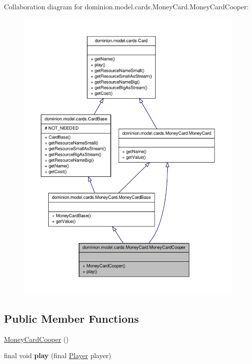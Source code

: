 \-Collaboration diagram for dominion.\-model.\-cards.\-Money\-Card.\-Money\-Card\-Cooper\-:
\nopagebreak
\begin{figure}[H]
\begin{center}
\leavevmode
\includegraphics[width=350pt]{classdominion_1_1model_1_1cards_1_1MoneyCard_1_1MoneyCardCooper__coll__graph}
\end{center}
\end{figure}
\subsection*{\-Public \-Member \-Functions}
\begin{DoxyCompactItemize}
\item 
\hyperlink{classdominion_1_1model_1_1cards_1_1MoneyCard_1_1MoneyCardCooper_a59049f8d6d866d2d9937bcdeaccf7ce4}{\-Money\-Card\-Cooper} ()
\item 
\hypertarget{classdominion_1_1model_1_1cards_1_1MoneyCard_1_1MoneyCardCooper_a44f0e2ef9c97eadbc08b07e50eba9317}{final void {\bfseries play} (final \hyperlink{interfacedominion_1_1model_1_1Player}{\-Player} player)}\label{classdominion_1_1model_1_1cards_1_1MoneyCard_1_1MoneyCardCooper_a44f0e2ef9c97eadbc08b07e50eba9317}

\end{DoxyCompactItemize}


